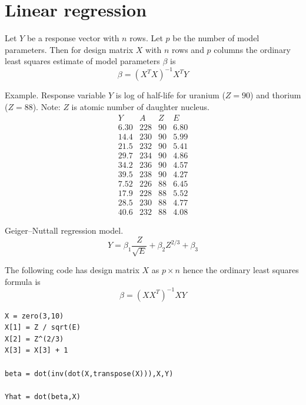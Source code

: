 \documentclass[12pt]{article}
\begin{document}
\fi

\newpage

\section{Linear regression}

Let $Y$ be a response vector with $n$ rows.
Let $p$ be the number of model parameters.
Then for design matrix $X$ with $n$ rows and $p$ columns the ordinary least squares
estimate of model parameters $\beta$ is
\begin{equation*}
\beta=(X^TX)^{-1}X^TY
\end{equation*}

Example.
Response variable $Y$ is log of half-life for uranium ($Z=90$)
and thorium ($Z=88$).
Note: $Z$ is atomic number of daughter nucleus.
\begin{equation*}
\begin{matrix}
Y & A & Z & E
\\[1ex]
6.30 & 228 & 90 & 6.80
\\
14.4 & 230 & 90 & 5.99
\\
21.5 & 232 & 90 & 5.41
\\
29.7 & 234 & 90 & 4.86
\\
34.2 & 236 & 90 & 4.57
\\
39.5 & 238 & 90 & 4.27
\\
7.52 & 226 & 88 & 6.45
\\
17.9 & 228 & 88 & 5.52
\\
28.5 & 230 & 88 & 4.77
\\
40.6 & 232 & 88 & 4.08
\end{matrix}
\end{equation*}

Geiger–Nuttall regression model.
\begin{equation*}
\hat Y=\beta_1\frac{Z}{\sqrt E}+\beta_2Z^{2/3}+\beta_3
\end{equation*}

The following code has design matrix $X$
as $p\times n$ hence the ordinary least squares formula is
\begin{equation*}
\beta=(XX^T)^{-1}XY
\end{equation*}

{\color{blue}
\begin{verbatim}
X = zero(3,10)
X[1] = Z / sqrt(E)
X[2] = Z^(2/3)
X[3] = X[3] + 1

beta = dot(inv(dot(X,transpose(X))),X,Y)

Yhat = dot(beta,X)
\end{verbatim}}
\end{document}
